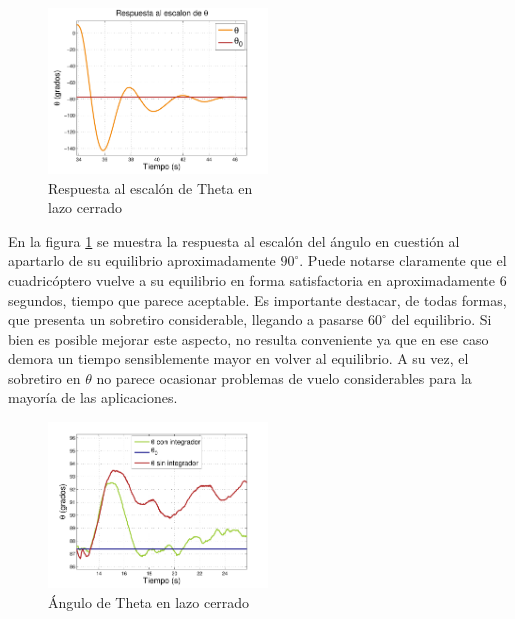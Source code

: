 \documentclass[main]{subfiles}
\begin{document}
\begin{figure}
	\vspace{-10pt}
	\centering
	\includegraphics[width=0.52\textwidth]{./pics_test_control/theta_esc.pdf}
	\caption{Respuesta al escal\'on de Theta en\\ lazo cerrado}
	\label{fig:theta_esc}
\end{figure}

En la figura \ref{fig:theta_esc} se muestra la respuesta al escalón del ángulo en cuestión al apartarlo de su equilibrio aproximadamente $90^\circ$. Puede notarse claramente que el cuadricóptero vuelve a su equilibrio en forma satisfactoria en aproximadamente 6 segundos, tiempo que parece aceptable. Es importante destacar, de todas formas, que presenta un sobretiro considerable, llegando a pasarse $60^\circ$ del equilibrio. Si bien es posible mejorar este aspecto, no resulta conveniente ya que en ese caso demora un tiempo sensiblemente mayor en volver al equilibrio. A su vez, el sobretiro en $\theta$ no parece ocasionar problemas de vuelo considerables para la mayoría de las aplicaciones.\\

\begin{figure}
	\centering
	\vspace{-10pt}
	\includegraphics[width=0.52\textwidth]{./pics_test_control/theta_sin_con_int.pdf}
	\caption{\'Angulo de Theta en lazo cerrado}
	\label{fig:theta_sin_con_int}
\end{figure}
\end{document}
